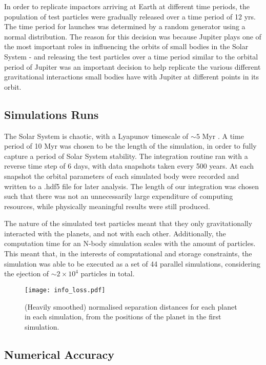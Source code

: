In order to replicate impactors arriving at Earth at different time periods, the population of test particles were gradually released over a time period of 12 yrs. The time period for launches was determined by a random generator using a normal distribution.  The reason for this decision was because Jupiter plays one of the most important roles in influencing the orbits of small bodies in the Solar System - and releasing the test particles over a time period similar to the orbital period of Jupiter was an important decision to help replicate the various different gravitational interactions small bodies have with Jupiter at different points in its orbit.

\subsection{Simulations Runs}

The Solar System is chaotic, with a Lyapunov timescale of $\sim 5$ Myr \citep{1996CeMDA..64..115L}. A time period of 10 Myr was chosen to be the length of the simulation, in order to fully capture a period of Solar System stability. The integration routine ran with a reverse time step of 6 days, with data snapshots taken every 500 years. At each snapshot the orbital parameters of each simulated body were recorded and written to a .hdf5 file for later analysis. The length of our integration was chosen such that there was not an unnecessarily large expenditure of computing resources, while physically meaningful results were still produced.

The nature of the simulated test particles meant that they only gravitationally interacted with the planets, and not with each other. Additionally, the computation time for an N-body simulation scales with the amount of particles. This meant that, in the interests of computational and storage constraints, the simulation was able to be executed as a set of 44 parallel simulations, considering the ejection of $\sim2\times10^{4}$ particles in total.

\begin{figure}[t!]
    \centering
    \texttt{[image: info\_loss.pdf]}
    \caption[Parallel simulations and their information losses]{(Heavily smoothed) normalised separation distances for each planet in each simulation, from the positions of the planet in the first simulation.}
    \label{fig:info_loss}
\end{figure}

\clearpage
\subsection{Numerical Accuracy}
\label{sec:accuracy}

